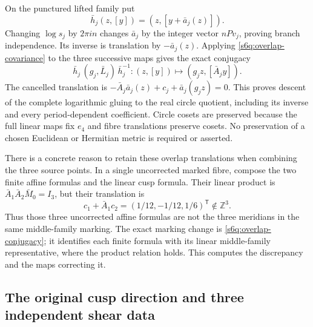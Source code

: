 On the punctured lifted family put
\[
 \bar h_j(z,[y])=(z,[y+\bar a_j(z)]).
\]
Changing $\log s_j$ by $2\pi in$ changes $\bar a_j$ by the integer
vector $nPv_j$, proving branch independence. Its inverse is translation
by $-\bar a_j(z)$. Applying \eqref{s6q:overlap-covariance} to the three
successive maps gives the exact conjugacy
\begin{equation}
 \bar h_j\,(g_j,\bar L_j)\,\bar h_j^{-1}
    :(z,[y])\longmapsto(g_jz,[\bar A_jy]).
 \label{s6q:overlap-conjugacy}
\end{equation}
The cancelled translation is
$-\bar A_j\bar a_j(z)+c_j+\bar a_j(g_jz)=0$.
This proves descent of the complete logarithmic gluing to the real
circle quotient, including its inverse and every period-dependent
coefficient. Circle cosets are preserved because the full linear maps
fix $e_4$ and fibre translations preserve cosets. No preservation of a
chosen Euclidean or Hermitian metric is required or asserted.

There is a concrete reason to retain these overlap translations when
combining the three source points. In a single uncorrected marked fibre,
compose the two finite affine formulas and the linear cusp formula. Their
linear product is $\bar A_1\bar A_2\bar M_0=I_3$, but their translation is
\[
 c_1+\bar A_1c_2=(1/12,-1/12,1/6)^{\mathsf T}\notin\mathbb Z^3.
\]
Thus those three uncorrected affine formulas are not the three meridians
in the same middle-family marking. The exact marking change is
\eqref{s6q:overlap-conjugacy}; it identifies each finite formula with its
linear middle-family representative, where the product relation holds.
This computes the discrepancy and the maps correcting it.

\subsection{The original cusp direction and three independent shear data}

